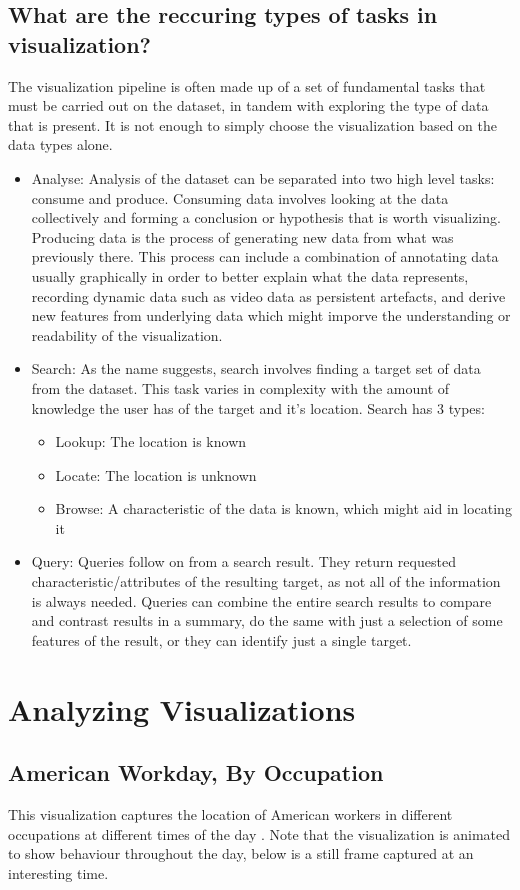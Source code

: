 \documentclass[12pt]{article}
\begin{document}
\subsection{What are the reccuring types of tasks in visualization?}
The visualization pipeline is often made up of a set of fundamental tasks that must be carried out on the dataset, in tandem with exploring the type of data that is present. It is not enough to simply choose the visualization based on the data types alone.
\begin{itemize}
    \item Analyse: Analysis of the dataset can be separated into two high level tasks: consume and produce. Consuming data involves looking at the data collectively and forming a conclusion or hypothesis that is worth visualizing. Producing data is the process of generating new data from what was previously there. This process can include a combination of annotating data usually graphically in order to better explain what the data represents, recording dynamic data such as video data as persistent artefacts, and derive new features from underlying data which might imporve the understanding or readability of the visualization.
	\item Search: As the name suggests, search involves finding a target set of data from the dataset. This task varies in complexity with the amount of knowledge the user has of the target and it's location. Search has 3 types: 
	\begin{itemize}
		\item Lookup: The location is known
		\item Locate: The location is unknown
		\item Browse: A characteristic of the data is known, which might aid in locating it
	\end{itemize}
    \item Query: Queries follow on from a search result. They return requested characteristic/attributes of the resulting target, as not all of the information is always needed. Queries can combine the entire search results to compare and contrast results in a summary, do the same with just a selection of some features of the result, or they can identify just a single target. 
\end{itemize}

\section{Analyzing Visualizations}
\subsection{American Workday, By Occupation}
This visualization captures the location of American workers in different occupations at different times of the day \cite{workday}. Note that the visualization is animated to show behaviour throughout the day, below is a still frame captured at an interesting time.
\end{document}
